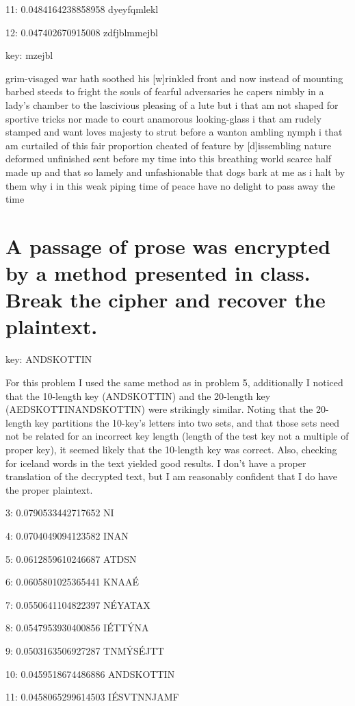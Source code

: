 \documentclass[]{article}
\begin{document}
11:	0.0484164238858958	dyeyfqmlekl

12:	0.047402670915008	zdfjblmmejbl

key: mzejbl

grim-visaged war hath soothed his [w]rinkled front and now instead of mounting barbed steeds to fright the souls of fearful adversaries he capers nimbly in a lady's chamber to the lascivious pleasing of a lute but i that am not shaped for sportive tricks nor made to court anamorous looking-glass i that am rudely stamped and want loves majesty to strut before a wanton ambling nymph i that am curtailed of this fair proportion cheated of feature by [d]issembling nature deformed unfinished sent before my time into this breathing world scarce half made up and that so lamely and unfashionable that dogs bark at me as i halt by them why i in this weak piping time of peace have no delight to pass away the time

\section{A passage of prose was encrypted by a method presented in class. Break the cipher and recover the plaintext.}
key: ANDSKOTTIN

For this problem I used the same method as in problem 5, additionally I noticed that the 10-length key (ANDSKOTTIN) and the 20-length key (AEDSKOTTINANDSKOTTIN) were strikingly similar.  Noting that the 20-length key partitions the 10-key's letters into two sets, and that those sets need not be related for an incorrect key length (length of the test key not a multiple of proper key), it seemed likely that the 10-length key was correct.  Also, checking for iceland words in the text yielded good results.  I don't have a proper translation of the decrypted text, but I am reasonably confident that I do have the proper plaintext.

3:	0.0790533442717652	\Thorn NI

4:	0.0704049094123582	INAN

5:	0.0612859610246687	ATDSN

6:	0.0605801025365441	KNA\Thorn AÉ

7:	0.0550641104822397	NÉYATAX

8:	0.0547953930400856	IÉTTÝNA\Thorn

9:	0.0503163506927287	TNMÝSÉJTT

10:	0.0459518674486886	ANDSKOTTIN

11:	0.0458065299614503	IÉSVTNNJAMF
\end{document}
